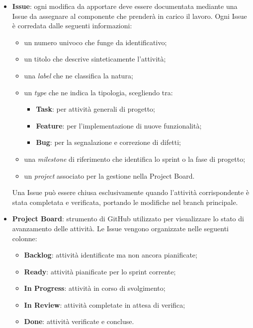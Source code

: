 \documentclass[10pt, letterpaper]{article}
\begin{document}
\begin{itemize}
    \item \textbf{Issue}: ogni modifica da apportare deve essere documentata 
    mediante una Issue da assegnare al componente che prenderà in carico 
    il lavoro. Ogni Issue è corredata dalle seguenti informazioni:
    \begin{itemize}
        \item un numero univoco che funge da identificativo;
        \item un titolo che descrive sinteticamente l'attività;
        \item una \textit{label} che ne classifica la natura;
        \item un \textit{type} che ne indica la tipologia, scegliendo tra:
        \begin{itemize}
            \item \textbf{Task}: per attività generali di progetto;
            \item \textbf{Feature}: per l'implementazione di nuove 
            funzionalità;
            \item \textbf{Bug}: per la segnalazione e correzione 
            di difetti;
        \end{itemize}
        \item una \textit{milestone} di riferimento che identifica 
        lo sprint o la fase di progetto;
        \item un \textit{project} associato per la gestione 
        nella Project Board.
    \end{itemize}
    Una Issue può essere chiusa esclusivamente quando l'attività 
    corrispondente è stata completata e verificata, portando le modifiche 
    nel branch principale.

    \item \textbf{Project Board}: strumento di GitHub utilizzato per 
    visualizzare lo stato di avanzamento delle attività. Le Issue vengono 
    organizzate nelle seguenti colonne:
    \begin{itemize}
        \item \textbf{Backlog}: attività identificate ma non ancora 
        pianificate;
        \item \textbf{Ready}: attività pianificate per lo sprint corrente;
        \item \textbf{In Progress}: attività in corso di svolgimento;
        \item \textbf{In Review}: attività completate in attesa di verifica;
        \item \textbf{Done}: attività verificate e concluse.
    \end{itemize}


\end{itemize}
\end{document}
